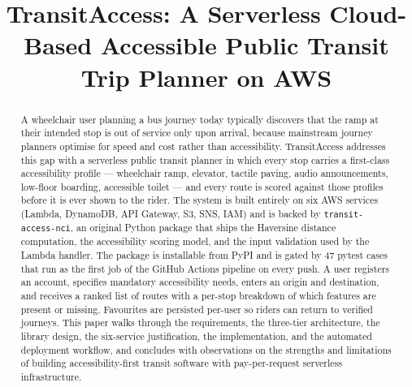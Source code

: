 \documentclass[conference]{IEEEtran}
\begin{document}
\title{TransitAccess: A Serverless Cloud-Based Accessible Public Transit Trip Planner on AWS}

\author{
}

\maketitle

\begin{abstract}
A wheelchair user planning a bus journey today typically discovers that the ramp at their intended stop is out of service only upon arrival, because mainstream journey planners optimise for speed and cost rather than accessibility. TransitAccess addresses this gap with a serverless public transit planner in which every stop carries a first-class accessibility profile — wheelchair ramp, elevator, tactile paving, audio announcements, low-floor boarding, accessible toilet — and every route is scored against those profiles before it is ever shown to the rider. The system is built entirely on six AWS services (Lambda, DynamoDB, API Gateway, S3, SNS, IAM) and is backed by \texttt{transit-access-nci}, an original Python package that ships the Haversine distance computation, the accessibility scoring model, and the input validation used by the Lambda handler. The package is installable from PyPI and is gated by 47 pytest cases that run as the first job of the GitHub Actions pipeline on every push. A user registers an account, specifies mandatory accessibility needs, enters an origin and destination, and receives a ranked list of routes with a per-stop breakdown of which features are present or missing. Favourites are persisted per-user so riders can return to verified journeys. This paper walks through the requirements, the three-tier architecture, the library design, the six-service justification, the implementation, and the automated deployment workflow, and concludes with observations on the strengths and limitations of building accessibility-first transit software with pay-per-request serverless infrastructure.
\end{abstract}
\end{document}
